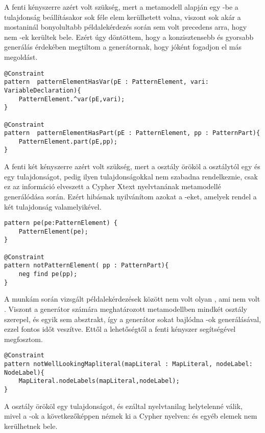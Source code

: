 A fenti kényszerre azért volt szükség, mert a metamodell alapján egy -be a  tulajdonság beállításakor sok féle elem kerülhetett volna, viszont sok akár a mostaninál bonyolultabb példalekérdezés során sem volt precedens arra, hogy nem  -ek kerültek bele. Ezért úgy döntöttem, hogy a konzisztensebb és gyorsabb generálás érdekében megtiltom a generátornak, hogy jóként fogadjon el más megoldást.


\begin{lstlisting}[style=viatrasmall]
@Constraint
pattern  patternElementHasVar(pE : PatternElement, vari: VariableDeclaration){
	PatternElement.^var(pE,vari);
}

@Constraint
pattern  patternElementHasPart(pE : PatternElement, pp : PatternPart){
	PatternElement.part(pE,pp);
}
\end{lstlisting}
 A fenti két kényszerre azért volt szükség, mert a  osztály örököl a  osztálytól egy  és egy  tulajdonságot, pedig ilyen tulajdonságokkal nem szabadna rendelkeznie, csak ez az információ elveszett a Cypher Xtext nyelvtanának metamodellé generálódása során. Ezért hibásnak nyilvánítom azokat a -eket, amelyek rendel a két tulajdonság valamelyikével. 


\begin{lstlisting}[style=viatrasmall]
pattern pe(pe:PatternElement) {
	PatternElement(pe);
}

@Constraint
pattern notPatternElement( pp : PatternPart){
	neg find pe(pp);
}
\end{lstlisting}

A munkám során vizsgált példalekérdezések között nem volt olyan , ami nem volt . Viszont a generátor számára meghatározott metamodellben mindkét osztály szerepel, és egyik sem absztrakt, így a generátor sokat bajlódna -ok generálásával, ezzel fontos időt veszítve. Ettől a lehetőségtől a fenti kényszer segítségével megfosztom.     

\begin{lstlisting}[style=viatrasmall]
@Constraint
pattern notWellLookingMapliteral(mapLiteral : MapLiteral, nodeLabel: NodeLabel){
	MapLiteral.nodeLabels(mapLiteral,nodeLabel);
}

\end{lstlisting}

A  osztály örököl egy  tulajdonságot, és ezáltal nyelvtanilag helytelenné válik, mivel a -ok a következőképpen néznek  ki a Cypher nyelven:  és egyéb elemek nem kerülhetnek bele. 

